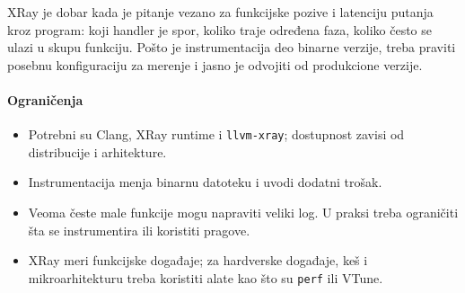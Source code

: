 XRay je dobar kada je pitanje vezano za funkcijske pozive i latenciju putanja kroz program: koji handler je spor, koliko traje određena faza, koliko često se ulazi u skupu funkciju. Pošto je instrumentacija deo binarne verzije, treba praviti posebnu konfiguraciju za merenje i jasno je odvojiti od produkcione verzije.

\paragraph{Ograničenja}\label{xray-ogranicenja}

\begin{itemize}
\tightlist
\item
  Potrebni su Clang, XRay runtime i \texttt{llvm-xray}; dostupnost zavisi od distribucije i arhitekture.
\item
  Instrumentacija menja binarnu datoteku i uvodi dodatni trošak.
\item
  Veoma česte male funkcije mogu napraviti veliki log. U praksi treba ograničiti šta se instrumentira ili koristiti pragove.
\item
  XRay meri funkcijske događaje; za hardverske događaje, keš i mikroarhitekturu treba koristiti alate kao što su \texttt{perf} ili VTune.
\end{itemize}
